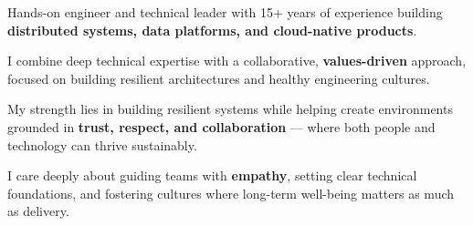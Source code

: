 

\begin{cvparagraph}

Hands-on engineer and technical leader with 15+ years of experience building \textbf{distributed systems, data platforms, and cloud-native products}.

I combine deep technical expertise with a collaborative, \textbf{values-driven} approach, focused on building resilient architectures and healthy engineering cultures.

My strength lies in building resilient systems while helping create environments grounded in \textbf{trust, respect, and collaboration} — where both people and technology can thrive sustainably.

I care deeply about guiding teams with \textbf{empathy}, setting clear technical foundations, and fostering cultures where long-term well-being matters as much as delivery.

\end{cvparagraph}
